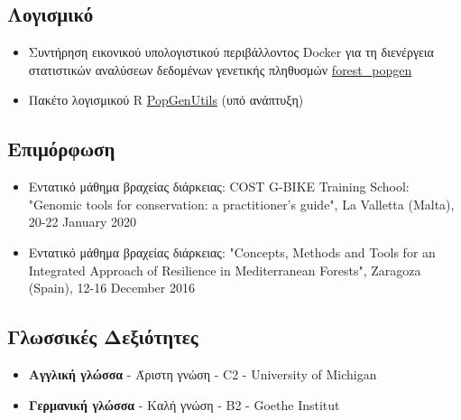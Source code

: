 \documentclass[12pt,]{scrartcl}
\begin{document}
\subsection{Λογισμικό}\label{software}
\begin{itemize}
\vspace{-3mm}
\setlength\itemsep{-0.6em}

\item Συντήρηση εικονικού υπολογιστικού περιβάλλοντος Docker για τη διενέργεια στατιστικών αναλύσεων δεδομένων γενετικής πληθυσμών 
\href{https://github.com/nikostourvas/forest_popgen}{forest\_popgen}

\item Πακέτο λογισμικού R \href{https://github.com/nikostourvas/PopGenUtils}{PopGenUtils} (υπό ανάπτυξη)

\end{itemize}

\subsection{Επιμόρφωση}\label{courses}
\begin{itemize}
\vspace{-3mm}
\setlength\itemsep{-0.6em}

\item Εντατικό μάθημα βραχείας διάρκειας:
COST G-BIKE Training School: "Genomic tools for conservation: a practitioner’s guide", La Valletta (Malta), 20-22 January 2020

\item Εντατικό μάθημα βραχείας διάρκειας: "Concepts, Methods and Tools for an Integrated Approach of Resilience in Mediterranean Forests", Zaragoza (Spain), 12-16 December 2016

\end{itemize}

\subsection{Γλωσσικές Δεξιότητες}\label{Γλώσσες}
\begin{itemize}
\vspace{-3mm}
%
\setlength\itemsep{-0.6em}
\item \textbf{Αγγλική γλώσσα} - Άριστη γνώση - C2 - University of Michigan

\item \textbf{Γερμανική γλώσσα} - Καλή γνώση - Β2 - Goethe Institut
\end{itemize}
\end{document}
